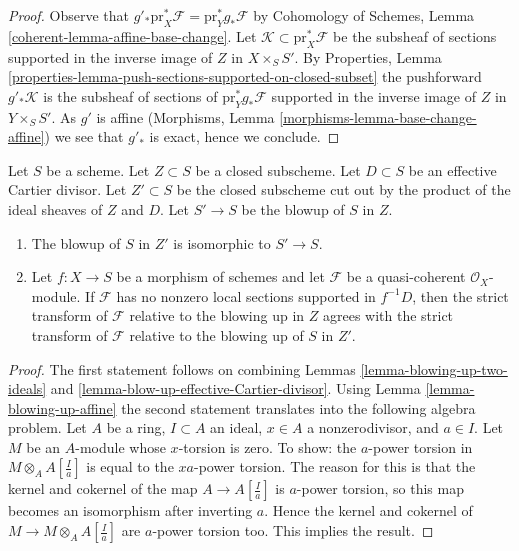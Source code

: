 \begin{proof}
Observe that $g'_*\text{pr}_X^*\mathcal{F} = \text{pr}_Y^*g_*\mathcal{F}$
by Cohomology of Schemes, Lemma \ref{coherent-lemma-affine-base-change}.
Let $\mathcal{K} \subset \text{pr}_X^*\mathcal{F}$ be the subsheaf
of sections supported in the inverse image of $Z$ in $X \times_S S'$.
By Properties, Lemma
\ref{properties-lemma-push-sections-supported-on-closed-subset}
the pushforward $g'_*\mathcal{K}$ is the subsheaf of sections of
$\text{pr}_Y^*g_*\mathcal{F}$ supported in the inverse
image of $Z$ in $Y \times_S S'$. As $g'$ is affine
(Morphisms, Lemma \ref{morphisms-lemma-base-change-affine})
we see that $g'_*$ is exact, hence we conclude.
\end{proof}

\begin{lemma}
\label{lemma-strict-transform-different-centers}
Let $S$ be a scheme. Let $Z \subset S$ be a closed subscheme.
Let $D \subset S$ be an effective Cartier divisor.
Let $Z' \subset S$ be the closed subscheme cut out by the product
of the ideal sheaves of $Z$ and $D$.
Let $S' \to S$ be the blowup of $S$ in $Z$.
\begin{enumerate}
\item The blowup of $S$ in $Z'$ is isomorphic to $S' \to S$.
\item Let $f : X \to S$ be a morphism of schemes and let $\mathcal{F}$
be a quasi-coherent $\mathcal{O}_X$-module. If $\mathcal{F}$ has
no nonzero local sections supported in $f^{-1}D$, then the
strict transform of $\mathcal{F}$ relative to the blowing up
in $Z$ agrees with the strict transform of $\mathcal{F}$ relative
to the blowing up of $S$ in $Z'$.
\end{enumerate}
\end{lemma}

\begin{proof}
The first statement follows on combining
Lemmas \ref{lemma-blowing-up-two-ideals} and
\ref{lemma-blow-up-effective-Cartier-divisor}.
Using Lemma \ref{lemma-blowing-up-affine} the second statement
translates into the
following algebra problem. Let $A$ be a ring, $I \subset A$ an ideal,
$x \in A$ a nonzerodivisor, and $a \in I$. Let $M$ be an $A$-module
whose $x$-torsion is zero. To show: the $a$-power torsion in
$M \otimes_A A[\frac{I}{a}]$ is equal to the $xa$-power torsion.
The reason for this is that the kernel and cokernel of the map
$A \to A[\frac{I}{a}]$ is $a$-power torsion, so this map becomes an
isomorphism after inverting $a$. Hence the kernel
and cokernel of $M \to M \otimes_A A[\frac{I}{a}]$ are $a$-power
torsion too. This implies the result.
\end{proof}


